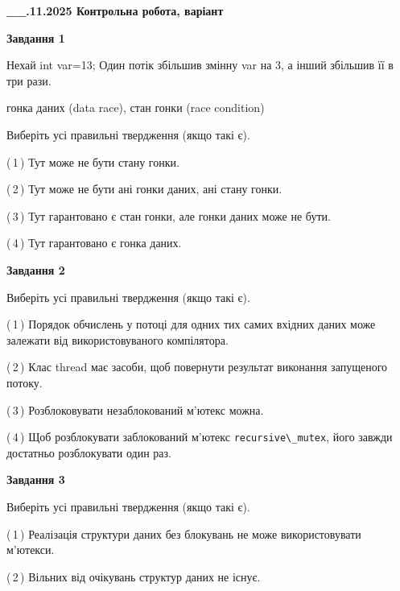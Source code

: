 \documentclass[12pt, ukrainian]{article}
\def\code#1{\Verb!#1!}
\begin{document}
\begin {large}

\textbf{\_\_.11.2025 Контрольна робота, варіант  }\par


{

\begin{center}
\textbf{Завдання 1}
\end{center}
Нехай int var=13; Один потік збільшив змінну var на 3, а інший збільшив її в три рази.

гонка даних (data race), стан гонки (race condition)

Виберіть усі правильні твердження (якщо такі є).\par
\vspace{2mm}
(\,1\,) Тут може не бути стану гонки.%

(\,2\,) Тут може не бути ані гонки даних, ані стану гонки.%

(\,3\,) Тут гарантовано є стан гонки, але гонки даних може не бути.%

(\,4\,) Тут гарантовано є гонка даних.%



\begin{center}
\textbf{Завдання 2}
\end{center}
Виберіть усі правильні твердження (якщо такі є).\par
\vspace{2mm}

(\,1\,) Порядок обчислень у потоці для одних тих самих вхідних даних може залежати від використовуваного компілятора.%

(\,2\,) Клас thread має засоби, щоб повернути результат виконання запущеного потоку.%

(\,3\,) Розблоковувати незаблокований м’ютекс можна.%

(\,4\,) Щоб розблокувати заблокований м’ютекс \code{recursive\_mutex}, його завжди достатньо розблокувати один раз.%



\begin{center}
\textbf{Завдання 3}
\end{center}
Виберіть усі правильні твердження (якщо такі є).\par
\vspace{2mm}

(\,1\,) Реалізація структури даних без блокувань не може використовувати м’ютекси.%

(\,2\,) Вільних від очікувань структур даних не існує.%

}
\end{large}
\end{document}

